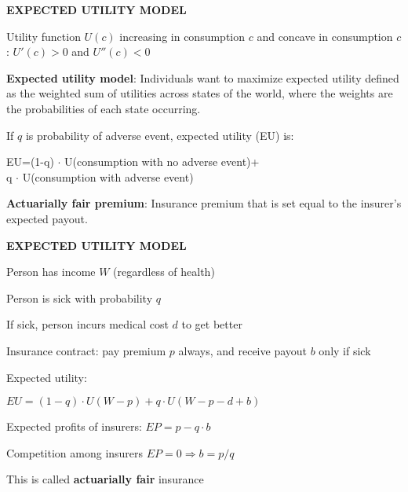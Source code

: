 \documentclass[landscape]{slides}
\begin{document}
\begin{slide}

\end{slide}


\begin{slide}
\begin{center}
{\bf EXPECTED UTILITY MODEL}
\end{center}
Utility function $U(c)$ increasing in consumption $c$ and concave in consumption $c$: $U'(c)>0$ and $U''(c)<0$

{\bf Expected utility model}: Individuals want to maximize expected utility defined as
the weighted sum of utilities across states of the world, where the weights are the probabilities of each state occurring.

If $q$ is probability of adverse event, expected utility (EU)  is:

EU=(1-q) $\cdot$ U(consumption with no adverse event)+ \\ q $\cdot$ U(consumption with adverse event)

\normalsize
{\bf Actuarially fair premium}:
Insurance premium that is set equal to the insurer's expected payout.
\end{slide}

\begin{slide}

\end{slide}



\begin{slide}
\begin{center}
{\bf EXPECTED UTILITY MODEL}
\end{center}


Person has income $W$ (regardless of health)

Person is sick with probability $q$

If sick, person incurs medical cost $d$ to get better

Insurance contract: pay premium $p$ always, and receive payout $b$ only if sick

Expected utility:

$EU=(1-q) \cdot U(W-p)+q  \cdot U(W-p-d+b)$

Expected profits of insurers: $EP=p-q \cdot b$

Competition among insurers $EP=0 \Rightarrow b=p/q$

This is called \textbf{actuarially fair} insurance

\end{slide}
\end{document}
